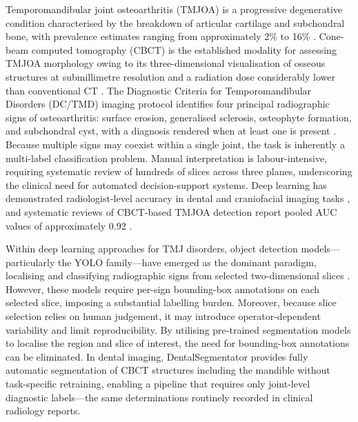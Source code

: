\documentclass[review,12pt]{elsarticle}
\begin{document}
Temporomandibular joint osteoarthritis (TMJOA) is a progressive
degenerative condition characterised by the breakdown of articular
cartilage and subchondral bone, with prevalence estimates ranging from
approximately 2\% to 16\% \cite{Xu2025bibliometric}. Cone-beam computed
tomography (CBCT) is the established modality for assessing TMJOA
morphology owing to its three-dimensional visualisation of osseous
structures at submillimetre resolution and a radiation dose
considerably lower than conventional CT
\cite{larheim2015temporomandibular,honey2007accuracy,ahmad2009research,schiffman2014diagnostic}. The Diagnostic
Criteria for Temporomandibular Disorders (DC/TMD) imaging protocol
identifies four principal radiographic signs of osteoarthritis: surface
erosion, generalised sclerosis, osteophyte formation, and subchondral
cyst, with a diagnosis rendered when at least one is present
\cite{schiffman2014diagnostic}. Because multiple signs may coexist
within a single joint, the task is inherently a multi-label
classification problem. Manual interpretation is labour-intensive,
requiring systematic review of hundreds of slices across three planes,
underscoring the clinical need for automated decision-support systems.
Deep learning has demonstrated radiologist-level accuracy in dental and
craniofacial imaging tasks
\cite{chen2019deep,choi2021artificial,talaat2023artificial}, and
systematic reviews of CBCT-based TMJOA detection report pooled AUC
values of approximately 0.92 \cite{xu2023artificial}.

Within deep learning approaches for TMJ disorders, object detection
models---particularly the YOLO family---have emerged as the dominant
paradigm, localising and classifying radiographic signs from selected
two-dimensional slices
\cite{talaat2023artificial,lee2020automated,Mao2025,fu2026cbct}.
However, these models require per-sign bounding-box annotations on each
selected slice, imposing a substantial labelling burden. Moreover,
because slice selection relies on human judgement, it may introduce
operator-dependent variability and limit reproducibility. By utilising pre-trained segmentation models to localise the region and slice of
interest, the need for bounding-box annotations can be eliminated. In dental imaging, DentalSegmentator
\cite{dot2024dentalsegmentator} provides fully automatic segmentation
of CBCT structures including the mandible without task-specific
retraining, enabling a pipeline that requires only
joint-level diagnostic labels---the same determinations routinely
recorded in clinical radiology reports.
\end{document}

